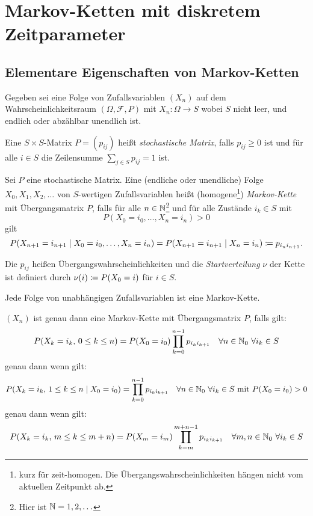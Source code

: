 \documentclass[a4paper,twoside,DIV15,BCOR12mm]{scrbook}
\newcommand{\cF}{\mathcal F}
\begin{document}
\renewcommand{\thesection}{\arabic{section}}
\renewcommand{\thechapter}{\Roman{chapter}}

\chapter{Markov-Ketten mit diskretem Zeitparameter}

\section{Elementare Eigenschaften von Markov-Ketten}

Gegeben sei eine Folge von Zufallsvariablen $(X_n)$ auf dem Wahrscheinlichkeitsraum $(\Omega, \cF, P)$ mit $X_n:\Omega \to S$ wobei $S$ nicht leer, und endlich oder abzählbar unendlich ist.

\begin{definition}
Eine $S\times S$-Matrix $P=(p_{ij})$ heißt \emph{stochastische Matrix}, falls $p_{ij}\ge0$ ist und für alle $i\in S$ die Zeilensumme $\sum_{j\in S} p_{ij} = 1$ ist.
\end{definition}

\begin{definition}
Sei $P$ eine stochastische Matrix. Eine (endliche oder unendliche) Folge $X_0, X_1, X_2,\ldots$ von $S$-wertigen Zufallsvariablen heißt (homogene\footnote{kurz für zeit-homogen. Die Übergangswahrscheinlichkeiten hängen nicht vom aktuellen Zeitpunkt ab.}) \emph{Markov-Kette} mit Übergangsmatrix $P$, falls für alle $n\in \mathbb{N}$\footnote{Hier ist $\mathbb{N}=1,2,\ldots$} und für alle Zustände $i_k\in S$ mit 
\[
P(X_0=i_0,\ldots,X_n=i_n) >0
\]
gilt
\[
P(X_{n+1} = i_{n+1} \mid X_0 = i_0, \ldots, X_n=i_n) = 
P(X_{n+1} = i_{n+1} \mid X_n=i_n)\da p_{i_n i_{n+1}}.
\]

Die $p_{ij}$ heißen Übergangswahrscheinlichkeiten und die \emph{Startverteilung} $\nu$ der Kette ist definiert durch $\nu(i)\da P(X_0=i)$ für $i\in S$.
\end{definition}

\begin{bemerkung}
Jede Folge von unabhängigen Zufallsvariablen ist eine Markov-Kette.
\end{bemerkung}

\begin{satz}
$(X_n)$ ist genau dann eine Markov-Kette mit Übergangsmatrix $P$, falls gilt:
\[
P(X_k = i_k,\, 0\le k\le n) = P(X_0 = i_0)\prod_{k=0}^{n-1} p_{i_k i_{k+1}} \quad \forall n\in \mathbb{N}_0 \ \forall i_k\in S
\]
genau dann wenn gilt:
\[
P(X_k = i_k,\, 1\le k\le n \mid X_0=i_0) = \prod_{k=0}^{n-1} p_{i_k i_{k+1}} \quad \forall n\in \mathbb{N}_0 \ \forall i_k\in S\text{ mit $P(X_0=i_0)>0$}
\]
genau dann wenn gilt:
\[
P(X_k = i_k,\,m\le k\le m+n) = P(X_m=i_m)\prod_{k=m}^{m+n-1} p_{i_k i_{k+1}} \quad \forall m,n\in \mathbb{N}_0 \ \forall i_k\in S
\]
\end{satz}
\end{document}

